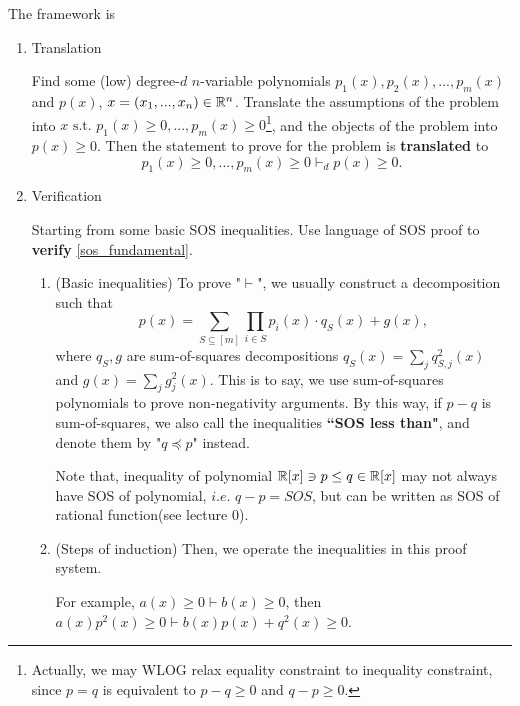 The framework is 
\begin{enumerate}
    \item Translation
    
    Find some (low) degree-$d$ $n$-variable polynomials $p_1(x),p_2(x),...,p_m(x)$ and $p(x)$, $x=(x_1,...,x_n)\in\mathbb{R}^n$. Translate the assumptions of the problem into $x\text{ s.t. }p_1(x)\ge 0,...,p_m(x)\ge 0$\footnote{Actually, we may WLOG relax equality constraint to inequality constraint, since $p=q$ is equivalent to $p-q\ge 0$ and $q-p\ge 0$.}, and the objects of the problem into $p(x)\ge 0$.
    Then the statement to prove for the problem is \textbf{translated} to
    \begin{equation}
        \label{sos_fundamental}
        p_1(x)\ge0,...,p_m(x)\ge 0\vdash_d p(x)\ge 0.
    \end{equation}

    \item Verification
    
    Starting from some basic SOS inequalities. Use language of SOS proof to \textbf{verify} \eqref{sos_fundamental}. 
    

    \begin{enumerate}
        \item (Basic inequalities) To prove "$\vdash$", we usually construct a decomposition such that 
        $$p(x)=\sum_{S\subseteq [m]}\prod_{i\in S}p_i(x)\cdot q_S(x)+g(x),$$ 
        where $q_S,g$ are sum-of-squares decompositions $q_S(x)=\sum_{j}q_{S,j}^2(x)$ and $g(x)=\sum_j g_j^2(x)$.
        This is to say, we use sum-of-squares polynomials to prove non-negativity arguments. 
        By this way, if $p-q$ is sum-of-squares, we also call the inequalities \textbf{``SOS less than"}, and denote them by "$q\preccurlyeq p$" instead.
        
        
        Note that, inequality of polynomial $\mathbb{R}[x]\ni p\le q\in\mathbb{R}[x]$ may not always have SOS of polynomial, $i.e.$ $q-p=SOS$, but can be written as SOS of rational function(see \cite{sos_schramm} lecture 0).

        \item (Steps of induction) Then, we operate the inequalities in this proof system. 
        
        For example,  $a(x)\ge 0\vdash b(x)\ge 0$, then $a(x)p^2(x)\ge 0\vdash b(x)p(x) + q^2(x)\ge 0$.
        
        

    \end{enumerate}


\end{enumerate}
